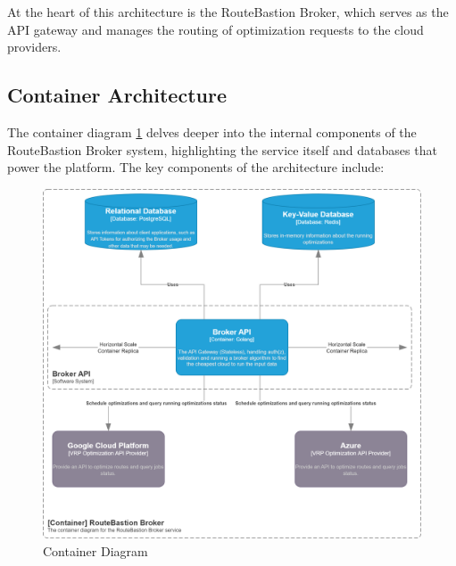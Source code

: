\documentclass[english,notblind]{sbc20}
\begin{document}
At the heart of this architecture is the RouteBastion Broker, which serves as the API gateway and manages the routing of optimization requests to the cloud providers.

\subsection{Container Architecture}
\label{subsec:container_architecture}
The container diagram \ref{fig:container} delves deeper into the internal components of the RouteBastion Broker system, highlighting the service itself and databases that power the platform. The key components of the architecture include:

\begin{figure}
  \includegraphics[width=\columnwidth]{figures/c4_diagrams/Container.png}
  \caption{Container Diagram\label{fig:container}}
\end{figure}
\end{document}
